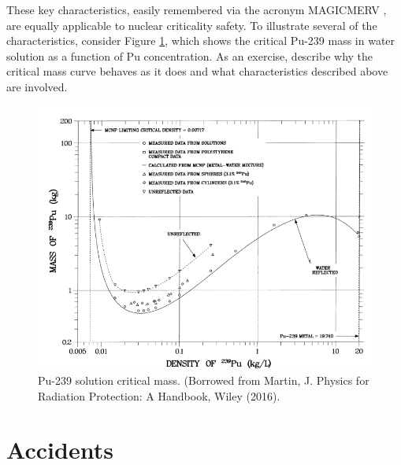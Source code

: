 These key characteristics, easily remembered via the acronym 
MAGICMERV \cite{pevey2010neu}, are equally applicable to nuclear
criticality safety. To illustrate several of the characteristics, 
consider Figure 
\ref{fig:pu_critical_mass}, which shows the critical Pu-239 mass in
water solution as a function of Pu concentration. As an exercise, 
describe why the critical mass curve behaves as it does and what
characteristics described above are involved.
\begin{figure}[ht] 
    \centering
    \includegraphics[keepaspectratio, width = 5.0 in]{images/pu_critical_mass}
    \caption{Pu-239 solution critical mass. (Borrowed from Martin, J. {
             Physics for Radiation Protection: A Handbook}, Wiley (2016).}
    \label{fig:pu_critical_mass}
\end{figure}


\section*{Accidents}

